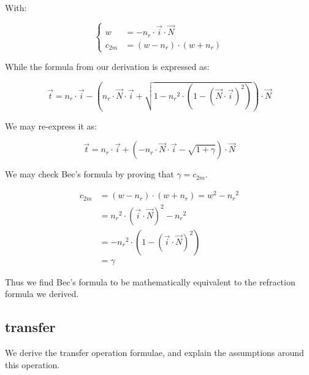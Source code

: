 With:

\begin{equation} \begin{cases}
w &= - n_r \cdot \overrightarrow{i} \cdot \overrightarrow{N} \\
c_{2m} &= (w - n_r) \cdot (w + n_r)
\end{cases} \end{equation}

While the formula from our derivation is expressed as:

\begin{equation}
\overrightarrow{t} = n_r \cdot \overrightarrow{i} -
\left(n_r \cdot \overrightarrow{N} \cdot \overrightarrow{i}
+ \sqrt{1 - {n_r}^2 \cdot \left(1 - 
             \left(\overrightarrow{N} \cdot \overrightarrow{i}\right)^2\right)}
\right)
\cdot \overrightarrow{N}
\end{equation}

We may re-express it as:

\begin{equation}
\overrightarrow{t} = n_r \cdot \overrightarrow{i} +
\left(- n_r \cdot \overrightarrow{N} \cdot \overrightarrow{i}
- \sqrt{1 + \gamma} \right) \cdot \overrightarrow{N}
\end{equation}

We may check Bec's formula by proving that $\gamma = c_{2m}$.

\begin{equation} \begin{split}
c_{2m} &= (w - n_r) \cdot (w + n_r) = w^2 - {n_r}^2 \\
       &= {n_r}^2 \cdot
          \left( \overrightarrow{i} \cdot \overrightarrow{N} \right)^2
          - {n_r}^2 \\
       &= -{n_r}^2 \cdot
           \left(1 - \left(\overrightarrow{i} \cdot
                     \overrightarrow{N}\right)^2\right) \\
       &= \gamma
\end{split} \end{equation}

Thus we find Bec's formula to be mathematically equivalent to the refraction
formula we derived.

\subsection{transfer}
We derive the transfer operation formulae, and explain the assumptions
around this operation.

